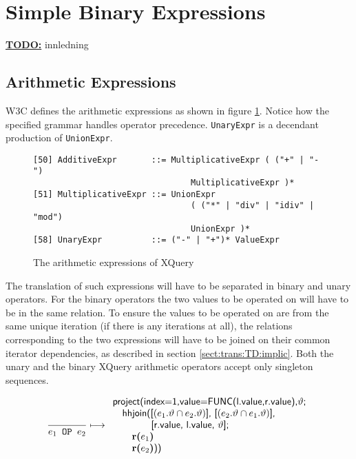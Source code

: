 \section{Simple Binary Expressions}
\underline{\textbf{\LARGE TODO:}} innledning

\subsection{Arithmetic Expressions}
\label{sect:trans:TD:atrith}
W3C defines the arithmetic expressions as shown in figure \ref{fig:trans:TD:arithEBNF}\cite{w3c00}. Notice how the
specified grammar handles operator precedence. \texttt{UnaryExpr} is a decendant production of \texttt{UnionExpr}.

\begin{figure}[h]
\begin{Verbatim}
[50] AdditiveExpr       ::= MultiplicativeExpr ( ("+" | "-") 
                                MultiplicativeExpr )*
[51] MultiplicativeExpr ::= UnionExpr 
                                ( ("*" | "div" | "idiv" | "mod")
                                UnionExpr )*
[58] UnaryExpr          ::= ("-" | "+")* ValueExpr
\end{Verbatim}
\caption{The arithmetic expressions of XQuery}
\label{fig:trans:TD:arithEBNF}
\end{figure}

The translation of such expressions will have to be separated in binary and unary operators. For the binary
operators the two values to be operated on will have to be in the same relation. To ensure the values to be
operated on are from the same unique iteration (if there is any iterations at all), the relations corresponding to
the two expressions will have to be joined on their common iterator dependencies, as described in section
\ref{sect:trans:TD:implic}. Both the unary and the binary XQuery arithmetic operators accept only singleton
sequences.

\begin{equation}
\frac{}{e_1 \mbox{\texttt{ OP }} e_2}\longmapsto
\begin{array}{l}
\mbox{\textsf{project(index=1,value=FUNC(l.value,r.value),}}\vartheta\mbox{\textsf{;}} \\ \quad
\mbox{\textsf{hhjoin([}}(e_1.\vartheta\cap e_2.\vartheta)\mbox{\textsf{], [}}(e_2.\vartheta\cap e_1.\vartheta)
\mbox{\textsf{],}} 
\\ \quad \quad \quad \quad\mbox{\textsf{[r.value, l.value, }}\vartheta\mbox{\textsf{];}} \\ \quad \quad
\mbox{\textbf{r(}}e_1\mbox{\textbf{)}} \\ \quad \quad
\mbox{\textbf{r(}}e_2\mbox{\textbf{)}\textsf{))}}
\end{array}
\label{rule:trans:TD:arithmetic}
\end{equation}

